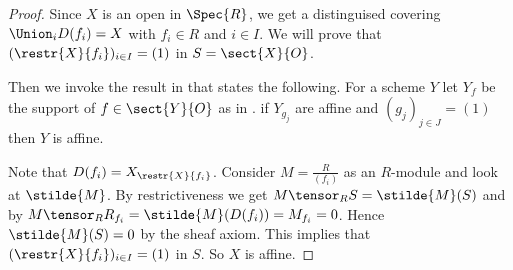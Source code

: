 \begin{proof}
Since $X$ is an open in $\Spec{R}$, 
we get a distinguised covering $\Union_i D(f_i) = X$ with $f_i\in R$
and $i\in I$.
We will prove that $(\restr{X}{f_i})_{i\in I} = (1)$ in $S = \sect{X}{O}$.

Then we invoke the result in \cite[Ex. 2.1.7]{harts} that states the following.
For a scheme $Y$ let $Y_f$  be the support of $f\in \sect{Y}{O}$ as in .
if $Y_{g_j}$ are affine and $(g_j)_{j\in J}=(1)$
then $Y$ is affine.

Note that $D(f_i) = X_{\restr{X}{f_i}}$.
Consider $M = \frac{R}{(f_i)}$ as an $R$-module and look at $\stilde{M}$.
By restrictiveness we get $M \tensor_R S = \stilde{M}(S)$ and  
by $M \tensor_R R_{f_i} = \stilde{M}(D(f_i)) = M_{f_i} = 0$. 
Hence $\stilde{M}(S) = 0$ by the sheaf axiom.
This implies that $(\restr{X}{f_i})_{i\in I} = (1)$ in $S$.
So $X$ is affine.
\end{proof}
